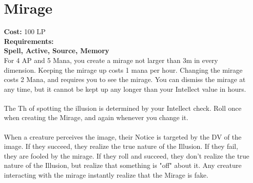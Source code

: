 \section{Mirage}\label{spell:mirage}
\textbf{Cost:} 100 LP\\
\textbf{Requirements:}\\
\textbf{Spell, Active, Source, Memory}\\
For 4 AP and 5 Mana, you create a mirage not larger than 3m in every dimension.
Keeping the mirage up costs 1 mana per hour.
Changing the mirage costs 2 Mana, and requires you to see the mirage.
You can dismiss the mirage at any time, but it cannot be kept up any longer than your Intellect value in hours.\\
\\
The Th of spotting the illusion is determined by your Intellect check.
Roll once when creating the Mirage, and again whenever you change it. \\
\\
When a creature perceives the image, their Notice is targeted by the DV of the image.
If they succeed, they realize the true nature of the Illusion.
If they fail, they are fooled by the mirage.
If they roll and succeed, they don't realize the true nature of the Illusion, but realize that something is "off" about it.
Any creature interacting with the mirage instantly realize that the Mirage is fake.\\